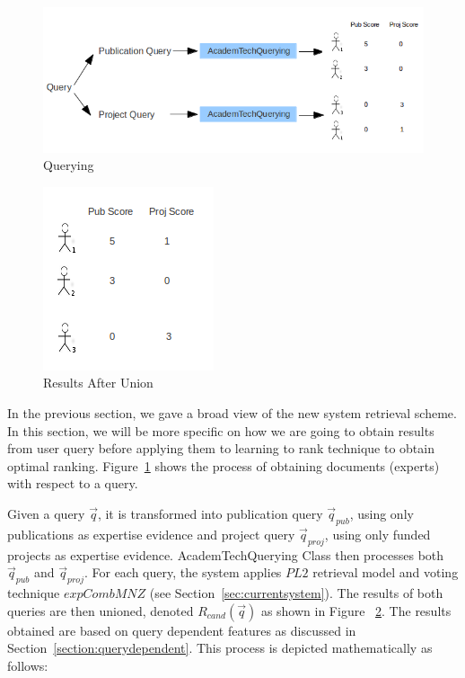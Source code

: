 \begin{figure}
\centering
\includegraphics[scale=0.4]{./figures/querying.png}
\caption{Querying} \label{fig:quering} 
\end{figure}
\quad
\begin{figure}
\centering
\includegraphics[scale=0.7]{./figures/union.png}
\caption{Results After Union} \label{fig:union} 
\end{figure}
In the previous section, we gave a broad view of the new system retrieval scheme. In this section, we will be more specific on how we are going to 
obtain results from user query before applying them to learning to rank technique to obtain optimal ranking.
Figure~\ref{fig:quering} shows the process of obtaining documents (experts) with respect to a query. 

Given a query $\vec{q}$, it is transformed into publication query $\vec{q}_{pub}$, using only publications as expertise evidence and project
query $\vec{q}_{proj}$, using only funded projects as expertise evidence. 
AcademTechQuerying Class then processes both $\vec{q}_{pub}$ and $\vec{q}_{proj}$. For each query, the system applies $PL2$
retrieval model and voting technique $expCombMNZ$ (see Section~\ref{sec:currentsystem}). The results of both
queries are then unioned, denoted $R_{cand}(\vec{q})$ as shown in Figure ~\ref{fig:union}. The results obtained are based on query dependent features 
as discussed in Section~\ref{section:querydependent}. This process is depicted mathematically as follows:

